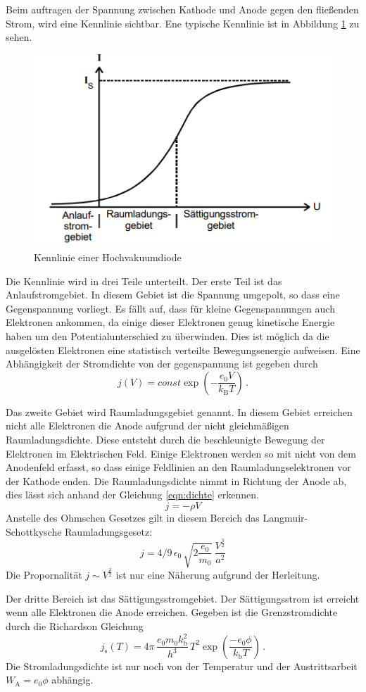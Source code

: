 Beim auftragen der Spannung zwischen Kathode und Anode gegen den fließenden Strom, wird eine Kennlinie sichtbar.
Ene typische Kennlinie ist in Abbildung \ref{fig:kennlinie} zu sehen.
\begin{figure}
    \centering
    \caption{Kennlinie einer Hochvakuumdiode \cite{v504}}
    \label{fig:kennlinie}
    \includegraphics[width = 0.5 \textwidth]{pics/kennlinie.png}
\end{figure}
Die Kennlinie wird in drei Teile unterteilt. 
Der erste Teil ist das Anlaufstromgebiet. In diesem Gebiet ist die Spannung umgepolt, so dass eine Gegenspannung vorliegt.
Es fällt auf, dass für kleine Gegenspannungen auch Elektronen ankommen, da einige dieser Elektronen genug kinetische Energie haben um den Potentialunterschied zu überwinden.
Dies ist möglich da die ausgelösten Elektronen eine statistisch verteilte Bewegungsenergie aufweisen. Eine Abhängigkeit der Stromdichte von der gegenspannung ist gegeben durch
\begin{equation}
    j(V)=const \exp\left(-\frac{e_0 V}{k_\text{B} T}\right) \, .
    \label{eqn:anlauf}
\end{equation}

Das zweite Gebiet wird Raumladungsgebiet genannt. In diesem Gebiet erreichen nicht alle Elektronen die Anode aufgrund der nicht gleichmäßigen Raumladungsdichte.
Diese entsteht durch die beschleunigte Bewegung der Elektronen im Elektrischen Feld. Einige Elektronen werden so mit nicht von dem Anodenfeld erfasst, so dass einige Feldlinien an den Raumladungselektronen vor der Kathode enden.
Die Raumladungsdichte nimmt in Richtung der Anode ab, dies lässt sich anhand der Gleichung \eqref{eqn:dichte} erkennen.
\begin{equation}
    j=- \rho V
    \label{eqn:dichte}
\end{equation}
Anstelle des Ohmschen Gesetzes gilt in diesem Bereich das Langmuir-Schottkysche Raumladungsgesetz:
\begin{equation}
    j=4/9 \, \epsilon_0\, \sqrt{2 \frac{e_0}{m_0}} \, \frac{V^{\frac{3}{2}}}{a^2}
    \label{eqn:drei halbe}
\end{equation}
Die Propornalität $j \sim V^{\frac{3}{2}}$ ist nur eine Näherung aufgrund der Herleitung.

Der dritte Bereich ist das Sättigungsstromgebiet. Der Sättigungsstrom ist erreicht wenn alle Elektronen die Anode erreichen. Gegeben ist die Grenzstromdichte durch die Richardson Gleichung
\begin{equation}
    j_{\text{s}}(T)=4 \pi\, \frac{e_0 m_0 k_\text{b}^2}{h^3}\, T^2 \exp \left(\frac{-e_0 \phi}{k_\text{b} T}\right) \, .
    \label{eqn:richard}
\end{equation}
Die Stromladungsdichte ist nur noch von der Temperatur und der Austrittsarbeit $W_\text{A}=e_0 \phi$ abhängig.
